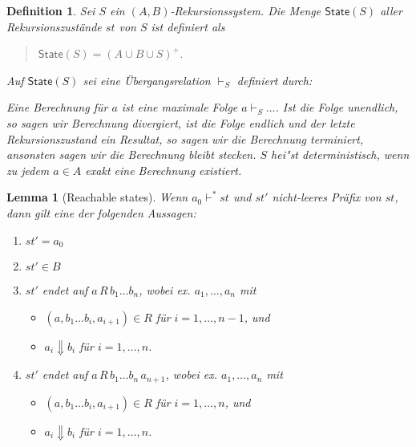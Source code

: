 \documentclass[12pt,a2paper,draft]{article}
\newtheorem{lemma}{Lemma}
\newtheorem{definition}{Definition}
\begin{document}
\begin{definition}
  Sei $S$ ein $(A,B)$-Rekursionssystem. Die Menge $\textsf{State}(S)$ aller
  \emph{Rekursionszust\"ande} $st$ von $S$ ist definiert als
  \begin{quote}
    $\textsf{State}(S) = (A \cup B \cup S)^+$.
  \end{quote}
  Auf $\textsf{State}(S)$ sei eine \"Ubergangsrelation $\vdash_S$ definiert durch:
  Eine \emph{Berechnung f\"ur $a$} ist eine maximale Folge $a \vdash_S \ldots$. Ist die Folge unendlich,
  so sagen wir Berechnung \emph{divergiert}, ist die Folge endlich und der letzte Rekursionszustand ein
  Resultat, so sagen wir die Berechnung \emph{terminiert}, ansonsten sagen wir die Berechnung \emph{bleibt
  stecken}. $S$ hei"st \emph{deterministisch}, wenn zu jedem $a \in A$ exakt eine Berechnung existiert.
\end{definition}

\begin{lemma}[Reachable states]
  Wenn $a_0 \vdash^* st$ und $st'$ nicht-leeres Pr\"afix von $st$, dann gilt eine
  der folgenden Aussagen:
  \begin{enumerate}
  \item[(1)] $st' = a_0$
  \item[(2)] $st' \in B$
  \item[(3)] $st'$ endet auf $a\,R\,b_1 \ldots b_n$, wobei ex. $a_1,\ldots,a_n$ mit
    \begin{itemize}
    \item $(a,b_1 \ldots b_i,a_{i+1}) \in R$ f\"ur $i=1,\ldots,n-1$, und
    \item $a_i \Downarrow b_i$ f\"ur $i=1,\ldots,n$.
    \end{itemize}
  \item[(4)] $st'$ endet auf $a\,R\,b_1 \ldots b_n\,a_{n+1}$, wobei ex. $a_1,\ldots,a_n$ mit
    \begin{itemize}
    \item $(a,b_1 \ldots b_i,a_{i+1}) \in R$ f\"ur $i=1,\ldots,n$, und
    \item $a_i \Downarrow b_i$ f\"ur $i=1,\ldots,n$.
    \end{itemize}
  \end{enumerate}
\end{lemma}
\end{document}
